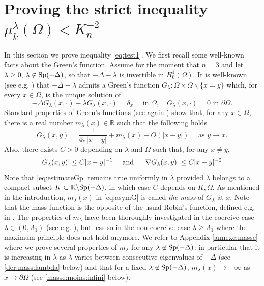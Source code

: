 \documentclass[10pt]{amsart}
\numberwithin{equation}{section}
\newcommand{\R}{\mathbb{R}}
\newcommand{\Sp}{{\rm Sp}}
\newcommand{\Om}{\Omega}
\newcommand{\mkl}{\mu_{k}^{\lambda}}
\def \bb{\hbox}
\theoremstyle{plain}
\theoremstyle{remark}
\begin{document}
\section{Proving the strict inequality $\mkl(\Om)<K_n^{-2}$} \label{fonctionstest}


In this section we prove inequality \eqref{eq:test1}. We first recall some well-known facts about the Green's function. Assume for the moment that $n=3$ and let $\lambda \ge0$, $\lambda \not \in \Sp(-\Delta)$, so that $-\Delta - \lambda$ is invertible in $H^1_0(\Om)$. It is well-known (see e.g.  \cite{RobDirichlet}) that $- \Delta - \lambda$ admits a Green's function  $G_\lambda: \overline{\Om} \times \overline{\Om} \backslash \{x=y\}$ which, for every $x \in \Om$, is the unique solution of 
\begin{equation} \label{green:coercif}
  - \Delta G_\lambda(x, \cdot) - \lambda G_\lambda(x, \cdot) = \delta_x \quad \text{ in } \Om, \quad G_\lambda(x, \cdot) = 0 \text{ in } \partial \Om.
 \end{equation}
Standard properties of Green's functions (see again \cite{RobDirichlet}) show that, for any $x \in \Om$, there is a real number $m_\lambda(x) \in \R$ such that the following holds
\begin{equation}\label{eq:asymG}
	G_\lambda(x,y)=\frac{1}{4 \pi |x-y|}+ m_\lambda(x) + O(|x-y|) \quad \text{ as } y \to x.
\end{equation}
Also, there exists $C>0$ depending on $\lambda$ and $\Om$ such that, for any $x \neq y$, 
\begin{equation}\label{eq:estimateGp}
	|G_\lambda(x,y)| \le C|x-y|^{-1} \quad \bb{ and } \quad |\nabla G_\lambda(x,y)|\le C|x-y|^{-2}.
\end{equation}
Note that \eqref{eq:estimateGp} remains true uniformly in $\lambda$ provided $\lambda$ belongs to a compact subset $K \subset \R \backslash \Sp(-\Delta)$, in which case $C$ depends on $K, \Om$. As mentioned in the introduction, $m_\lambda(x)$ in \eqref{eq:asymG} is called \emph{the mass} of $G_{\lambda}$ at $x$. Note that the mass function is the opposite of the usual Robin's function, defined e.g. in  \cite[Appendix A]{DelPinoDolbeaultMusso}. The properties of $m_\lambda$ have been thoroughly investigated in the coercive case $\lambda \in (0, \Lambda_1)$ (see e.g. \cite{DelPinoDolbeaultMusso}), but less so in the non-coercive case $\lambda \ge \Lambda_1$ where the maximum principle does not hold anymore. We refer to Appendix \ref{annexe:masse} where we prove several properties of $m_\lambda$ for any $\lambda \not \in \Sp(-\Delta)$: in particular that it is increasing in $\lambda$ as $\lambda$ varies between consecutive eigenvalues of $- \Delta$ (see \eqref{der:mass:lambda} below) and that for a fixed $\lambda \not \in \Sp(-\Delta)$, $m_\lambda(x) \to - \infty$ as $x \to \partial \Om$ (see \eqref{masse:moins:infini} below). 
\end{document}
